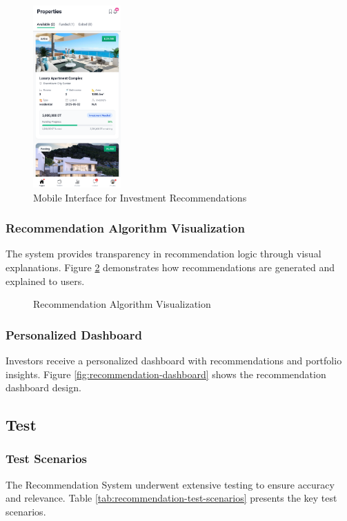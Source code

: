 \begin{figure}[htbp]
    \centering
    \includegraphics[width=0.3\textwidth]{images/recommendation_mobile.png}
    \caption{Mobile Interface for Investment Recommendations}
    \label{fig:recommendation-mobile}
\end{figure}

\subsubsection{Recommendation Algorithm Visualization}
The system provides transparency in recommendation logic through visual explanations. Figure \ref{fig:recommendation-algorithm} demonstrates how recommendations are generated and explained to users.

\begin{figure}[htbp]
    \centering
    \caption{Recommendation Algorithm Visualization}
    \label{fig:recommendation-algorithm}
\end{figure}

\subsubsection{Personalized Dashboard}
Investors receive a personalized dashboard with recommendations and portfolio insights. Figure \ref{fig:recommendation-dashboard} shows the recommendation dashboard design.


\subsection{Test}
\subsubsection{Test Scenarios}
The Recommendation System underwent extensive testing to ensure accuracy and relevance. Table \ref{tab:recommendation-test-scenarios} presents the key test scenarios.

